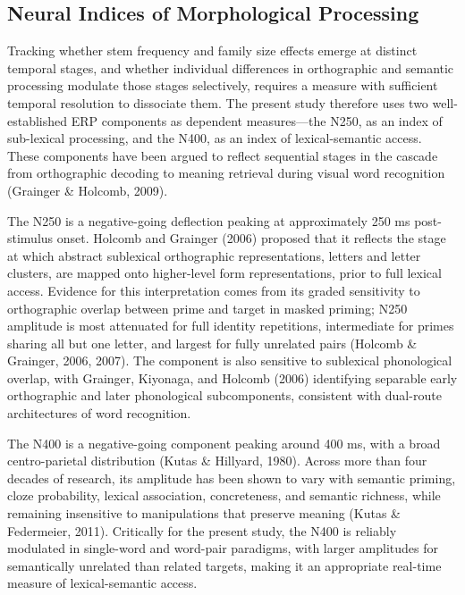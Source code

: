 \documentclass[utf8]{FrontiersinHarvard} %
\begin{document}
\subsection{Neural Indices of Morphological Processing}

Tracking whether stem frequency and family size effects emerge at distinct temporal stages, and whether individual differences in orthographic and semantic processing modulate those stages selectively, requires a measure with sufficient temporal resolution to dissociate them. The present study therefore uses two well-established ERP components as dependent measures—the N250, as an index of sub-lexical processing, and the N400, as an index of lexical-semantic access. These components have been argued to reflect sequential stages in the cascade from orthographic decoding to meaning retrieval during visual word recognition (Grainger \& Holcomb, 2009).

The N250 is a negative-going deflection peaking at approximately 250 ms post-stimulus onset. Holcomb and Grainger (2006) proposed that it reflects the stage at which abstract sublexical orthographic representations, letters and letter clusters, are mapped onto higher-level form representations, prior to full lexical access. Evidence for this interpretation comes from its graded sensitivity to orthographic overlap between prime and target in masked priming; N250 amplitude is most attenuated for full identity repetitions, intermediate for primes sharing all but one letter, and largest for fully unrelated pairs (Holcomb \& Grainger, 2006, 2007). The component is also sensitive to sublexical phonological overlap, with Grainger, Kiyonaga, and Holcomb (2006) identifying separable early orthographic and later phonological subcomponents, consistent with dual-route architectures of word recognition.

The N400 is a negative-going component peaking around 400 ms, with a broad centro-parietal distribution (Kutas \& Hillyard, 1980). Across more than four decades of research, its amplitude has been shown to vary with semantic priming, cloze probability, lexical association, concreteness, and semantic richness, while remaining insensitive to manipulations that preserve meaning (Kutas \& Federmeier, 2011). Critically for the present study, the N400 is reliably modulated in single-word and word-pair paradigms, with larger amplitudes for semantically unrelated than related targets, making it an appropriate real-time measure of lexical-semantic access.
\end{document}
